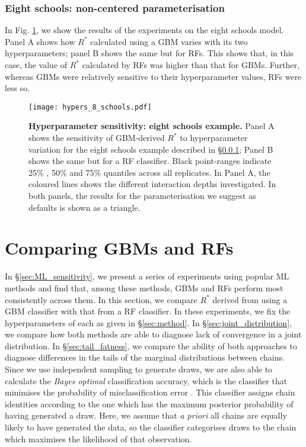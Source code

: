 \documentclass{article}
\begin{document}
\subsubsection{Eight schools: non-centered parameterisation}\label{sec:hyperparameters_8_schools}
In Fig. \ref{fig:hypers_8_schools}, we show the results of the experiments on the eight schools model. Panel A shows how $R^*$ calculated using a GBM varies with its two hyperparameters; panel B shows the same but for RFs. This shows that, in this case, the value of $R^*$ calculated by RFs was higher than that for GBMs. Further, whereas GBMs were relatively sensitive to their hyperparameter values, RFs were less so.

\begin{figure}[!htb]
	\centerline{\texttt{[image: hypers\_8\_schools.pdf]}}
	\caption{\textbf{Hyperparameter sensitivity: eight schools example.} Panel A shows the sensitivity of GBM-derived $R^*$ to hyperparameter variation for the eight schools example described in \S\ref{sec:hyperparameters_8_schools}; Panel B shows the same but for a RF classifier. Black point-ranges indicate 25\% , 50\% and 75\% quantiles across all replicates. In Panel A, the coloured lines shows the different interaction depths investigated. In both panels, the results for the parameterisation we suggest as defaults is shown as a triangle.}
	\label{fig:hypers_8_schools}
\end{figure}

\color{black}

\color{red}
\section{Comparing GBMs and RFs}\label{sec:comparison_gbm_rf}
In \S\ref{sec:ML_sensitivity}, we present a series of experiments using popular ML methods and find that, among these methods, GBMs and RFs perform most consistently across them. In this section, we compare $R^*$ derived from using a GBM classifier with that from a RF classifier. In these experiments, we fix the hyperparameters of each as given in \S\ref{sec:method}. In \S\ref{sec:joint_distribution}, we compare how both methods are able to diagnose lack of convergence in a joint distribution. In \S\ref{sec:tail_fatness}, we compare the ability of both approaches to diagnose differences in the tails of the marginal distributions between chains. Since we use independent sampling to generate draws, we are also able to calculate the \textit{Bayes optimal} classification accuracy, which is the classifier that minimises the probability of misclassification error \citep{devroye2013probabilistic}. This classifier assigns chain identities according to the one which has the maximum posterior probability of having generated a draw. Here, we assume that \textit{a priori} all chains are equally likely to have generated the data, so the classifier categorises draws to the chain which maximises the likelihood of that observation.
\end{document}
